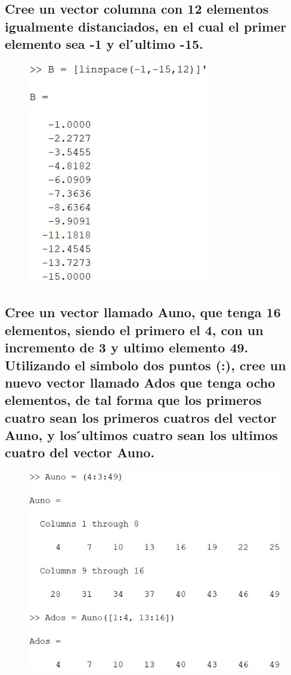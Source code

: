 \documentclass{article}
\begin{document}
\subsection{Cree un vector columna con 12 elementos igualmente distanciados, en el cual el primer elemento sea -1 y el  ́ultimo -15.}

\begin{figure}[H]
    \centering
    \includegraphics[width = 8cm]{img4.jpg}
\end{figure}

\subsection{Cree un vector llamado Auno, que tenga 16 elementos, siendo el primero el 4, con un incremento de 3 y ultimo elemento 49. Utilizando el simbolo dos puntos (:), cree un nuevo vector llamado Ados que tenga ocho elementos, de tal forma que los primeros cuatro sean los primeros cuatros del vector Auno, y los  ́ultimos cuatro sean los ultimos cuatro del vector Auno.}

\begin{figure}[H]
    \centering
    \includegraphics[width = 12cm]{img5.jpg}
\end{figure}
\end{document}
